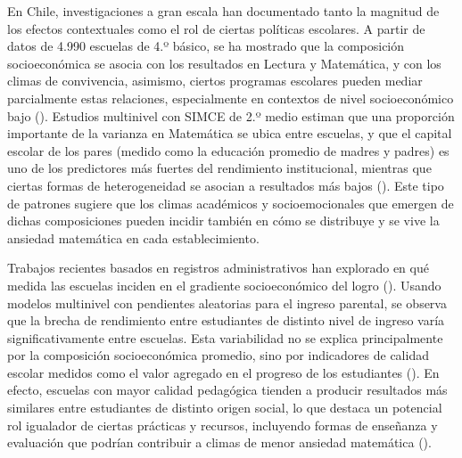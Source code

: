 \documentclass[
  spanish,
  a4paper,
  oneside]{scrbook}
\begin{document}
En Chile, investigaciones a gran escala han documentado tanto la
magnitud de los efectos contextuales como el rol de ciertas políticas
escolares. A partir de datos de 4.990 escuelas de 4.º básico, se ha
mostrado que la composición socioeconómica se asocia con los resultados
en Lectura y Matemática, y con los climas de convivencia, asimismo,
ciertos programas escolares pueden mediar parcialmente estas relaciones,
especialmente en contextos de nivel socioeconómico bajo
().
Estudios multinivel con SIMCE de 2.º medio estiman que una proporción
importante de la varianza en Matemática se ubica entre escuelas, y que
el capital escolar de los pares (medido como la educación promedio de
madres y padres) es uno de los predictores más fuertes del rendimiento
institucional, mientras que ciertas formas de heterogeneidad se asocian
a resultados más bajos
().
Este tipo de patrones sugiere que los climas académicos y
socioemocionales que emergen de dichas composiciones pueden incidir
también en cómo se distribuye y se vive la ansiedad matemática en cada
establecimiento.

Trabajos recientes basados en registros administrativos han explorado en
qué medida las escuelas inciden en el gradiente socioeconómico del logro
().
Usando modelos multinivel con pendientes aleatorias para el ingreso
parental, se observa que la brecha de rendimiento entre estudiantes de
distinto nivel de ingreso varía significativamente entre escuelas. Esta
variabilidad no se explica principalmente por la composición
socioeconómica promedio, sino por indicadores de calidad escolar medidos
como el valor agregado en el progreso de los estudiantes
(). En
efecto, escuelas con mayor calidad pedagógica tienden a producir
resultados más similares entre estudiantes de distinto origen social, lo
que destaca un potencial rol igualador de ciertas prácticas y recursos,
incluyendo formas de enseñanza y evaluación que podrían contribuir a
climas de menor ansiedad matemática
().
\end{document}

